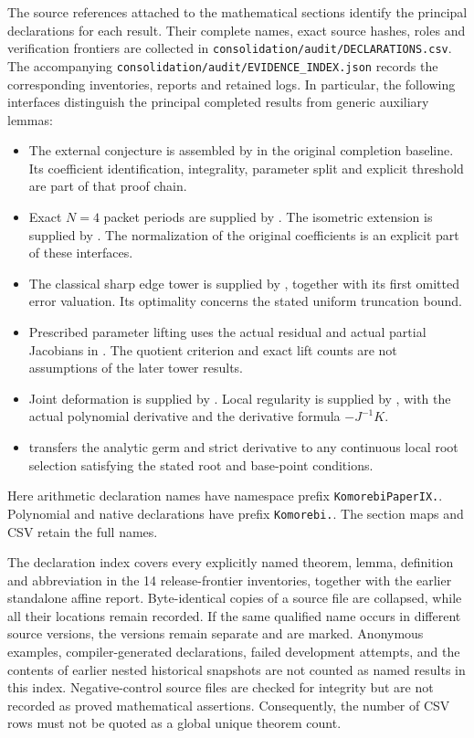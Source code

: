The source references attached to the mathematical sections identify the
principal declarations for each result. Their complete names, exact source
hashes, roles and verification frontiers are collected in
\texttt{consolidation/audit/DECLARATIONS.csv}. The accompanying
\nolinkurl{consolidation/audit/EVIDENCE_INDEX.json} records the corresponding inventories,
reports and retained logs. In particular, the following interfaces distinguish
the principal completed results from generic auxiliary lemmas:
\begin{itemize}
\item The external conjecture is assembled by
 in the original completion
baseline. Its coefficient identification, integrality, parameter split and
explicit threshold are part of that proof chain.
\item Exact $N=4$ packet periods are supplied by
. The isometric extension
is supplied by . The
normalization of the original coefficients is an explicit part of these
interfaces.
\item The classical sharp edge tower is supplied by
, together with its
first omitted error valuation. Its optimality concerns the stated uniform
truncation bound.
\item Prescribed parameter lifting uses the actual residual and actual
partial Jacobians in
.
The quotient criterion and exact lift counts are not assumptions of the
later tower results.
\item Joint deformation is supplied by
.
Local regularity is supplied by
, with the
actual polynomial derivative and the derivative formula $-J^{-1}K$.
\item {}
transfers the analytic germ and strict derivative to any continuous local
root selection satisfying the stated root and base-point conditions.
\end{itemize}
Here arithmetic declaration names have namespace prefix
\texttt{KomorebiPaperIX.}. Polynomial and native declarations have prefix
\texttt{Komorebi.}. The section maps and CSV retain the full names.

The declaration index covers every explicitly named theorem, lemma,
definition and abbreviation in the 14 release-frontier inventories, together
with the earlier standalone affine report. Byte-identical copies of a source
file are collapsed, while all their locations remain recorded. If the same
qualified name occurs in different source versions, the versions remain
separate and are marked. Anonymous examples, compiler-generated declarations,
failed development attempts, and the contents of earlier nested historical
snapshots are not counted as named results in this index. Negative-control
source files are checked for integrity but are not recorded as proved
mathematical assertions. Consequently, the number of CSV rows must not be
quoted as a global unique theorem count.

